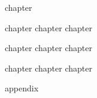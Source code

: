 \documentclass[a4paper,10pt,twoside]{MFHbook}
\begin{document}








\cleardoublepage
{}
     {chapter}

        {chapter}
   {chapter}
     {chapter}

{chapter}
{chapter}
  {chapter}

  {chapter}
{chapter}
   {chapter}


 {appendix}





\end{document}
